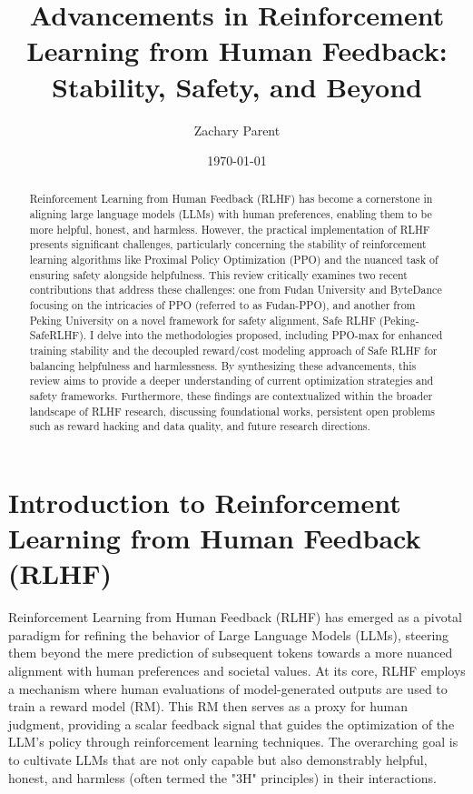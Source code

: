 \documentclass{article}
\title{Advancements in Reinforcement Learning from Human Feedback: Stability, Safety, and Beyond}
\author{Zachary Parent}
\date{\today}
\begin{document}
\maketitle

\begin{abstract}
Reinforcement Learning from Human Feedback (RLHF) has become a cornerstone in aligning large language models (LLMs) with human preferences, enabling them to be more helpful, honest, and harmless. However, the practical implementation of RLHF presents significant challenges, particularly concerning the stability of reinforcement learning algorithms like Proximal Policy Optimization (PPO) and the nuanced task of ensuring safety alongside helpfulness. This review critically examines two recent contributions that address these challenges: one from Fudan University and ByteDance focusing on the intricacies of PPO (referred to as Fudan-PPO), and another from Peking University on a novel framework for safety alignment, Safe RLHF (Peking-SafeRLHF). I delve into the methodologies proposed, including PPO-max for enhanced training stability and the decoupled reward/cost modeling approach of Safe RLHF for balancing helpfulness and harmlessness. By synthesizing these advancements, this review aims to provide a deeper understanding of current optimization strategies and safety frameworks. Furthermore, these findings are contextualized within the broader landscape of RLHF research, discussing foundational works, persistent open problems such as reward hacking and data quality, and future research directions.
\end{abstract}

\section{Introduction to Reinforcement Learning from Human Feedback (RLHF)}
\label{sec:introduction}

Reinforcement Learning from Human Feedback (RLHF) has emerged as a pivotal paradigm for refining the behavior of Large Language Models (LLMs), steering them beyond the mere prediction of subsequent tokens towards a more nuanced alignment with human preferences and societal values. \cite{Ouyang2022InstructGPT} At its core, RLHF employs a mechanism where human evaluations of model-generated outputs are used to train a reward model (RM). This RM then serves as a proxy for human judgment, providing a scalar feedback signal that guides the optimization of the LLM's policy through reinforcement learning techniques. The overarching goal is to cultivate LLMs that are not only capable but also demonstrably helpful, honest, and harmless (often termed the "3H" principles) in their interactions. \cite{Ouyang2022InstructGPT}
\end{document}
